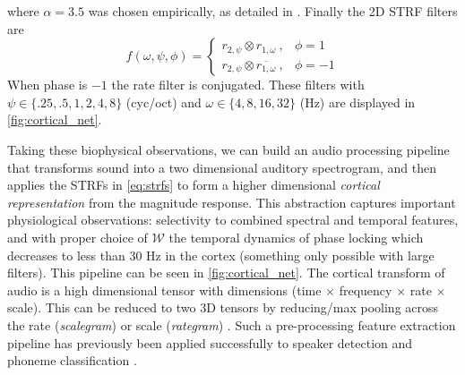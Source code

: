 \documentclass{article}
\newcommand{\abs}[1]{\left\lvert#1\right\rvert}
\begin{document}
\noindent
where $\alpha=3.5$ was chosen empirically, as detailed in \cite{nsl_doc}.
Finally the 2D STRF filters are
\begin{equation}
f(\omega,\psi,\phi) = \begin{cases}
r_{2,\psi} \otimes r_{1,\omega} \ , & \phi = 1 \\
r_{2,\psi} \otimes \overline{r_{1,\omega}} \ , & \phi = -1
\end{cases}%
\label{eq:strfs}
\end{equation}
\noindent
When phase is $-1$ the rate filter is conjugated.
These filters with $\psi\in\{.25, .5, 1, 2, 4, 8\}$ (cyc/oct) and $\omega\in \{4, 8, 16, 32\}$ (Hz) are displayed in \cref{fig:cortical_net}.
%
%
\begin{comment}
\begin{figure}[t!]
\centering
\texttt{[image: figures/cortical\_complex\_enhanced]}
\caption{...}
\label{fig:cortical_filt}
\end{figure}
The 48 cortical filters used in the cortical network. Along the rows are the six scale parameters $\psi \in \{.25, .5, 1, 2, 4, 8\}$, the left four columns are the rate parameters $\omega \in \{4, 8, 16, 32\}$ with phase $\phi=+1$ and the four right columns have phase $\phi=-1$ and the same scale $\times$ rate parameters. Colorization with hue = $(\angle z + \pi)  / (2\pi) + 1/2$ and lightness = $1 - 1/(1 + \abs{z}^{0.3})$.
\end{comment}
%
Taking these biophysical observations, we can build an audio processing pipeline that transforms sound into a two dimensional auditory spectrogram, and then applies the STRFs in \cref{eq:strfs} to form a higher dimensional {\it cortical representation} from the magnitude response. This abstraction captures important physiological observations: selectivity to combined spectral and temporal features, and with proper choice of $\mathcal{W}$ the temporal dynamics of phase locking which decreases to less than 30 Hz in the cortex \cite{chi_2005} (something only possible with large filters).
This pipeline can be seen in \cref{fig:cortical_net}.
The cortical transform of audio is a high dimensional tensor with dimensions (time $\times$ frequency $\times$ rate $\times$ scale).
This can be reduced to two 3D tensors by reducing/max pooling across the rate ({\it scalegram}) or scale ({\it rategram}) \cite{mesgarani_2011}.
%
Such a pre-processing feature extraction pipeline has previously been applied successfully to speaker detection \cite{mesgarani_2006} and phoneme classification \cite{mesgarani_2011}.
\end{document}
